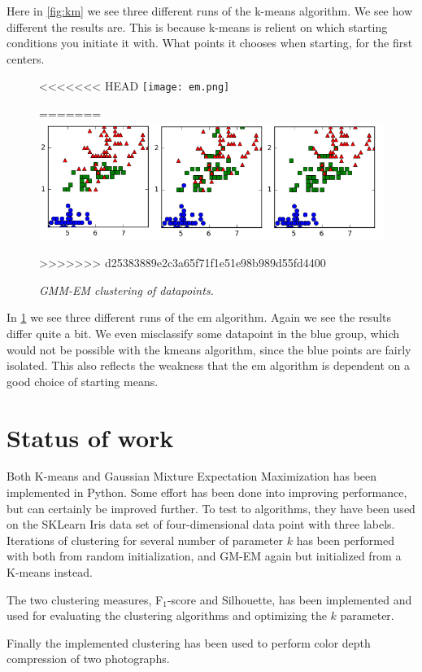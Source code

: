 \documentclass[a4paper,10pt,article,oneside,english]{memoir}
\let\oldcaption\caption
\renewcommand{\caption}[1]{\oldcaption{\emph{#1}}}
\begin{document}
Here in \ref{fig:km} we see three different runs of the k-means algorithm. We see how different the results are. This is because k-means is relient on which starting conditions you initiate it with. What points it chooses when starting, for the first centers.
\begin{figure}
	\centering
<<<<<<< HEAD
	\texttt{[image: em.png]}
	\caption{}
=======
	\includegraphics[width=\textwidth]{em1.png}
	\caption{GMM-EM clustering of datapoints.}
>>>>>>> d25383889e2c3a65f71f1e51e98b989d55fd4400
	\label{fig:em}
\end{figure}
In \ref{fig:em} we see three different runs of the em algorithm. Again we see the results differ quite a bit. We even misclassify some datapoint in the blue group, which would not be possible with the kmeans algorithm, since the blue points are fairly isolated. This also reflects the weakness that the em algorithm is dependent on a good choice of starting means.

\section*{Status of work}
Both K-means and Gaussian Mixture Expectation Maximization has been implemented in Python. Some effort has been done into improving performance, but can certainly be improved further. To test to algorithms, they have been used on the SKLearn Iris data set of four-dimensional data point with three labels. Iterations of clustering for several number of parameter $k$ has been performed with both from random initialization, and GM-EM again but initialized from a K-means instead. 

The two clustering measures, F$_1$-score and Silhouette, has been implemented and used for evaluating the clustering algorithms and optimizing the $k$ parameter. 

Finally the implemented clustering has been used to perform color depth compression of two photographs. 
\end{document}
